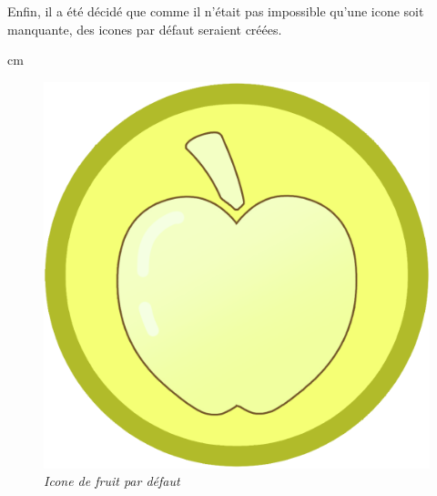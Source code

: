 \documentclass[12pt]{article}
\begin{document}
    Enfin, il a été décidé que comme il n'était pas impossible qu'une icone soit manquante, des icones par défaut seraient créées. 

     cm

    \begin{figure}[h!]
        \centering
        \includegraphics[scale = 0.2]{static/Base_Fruit.png}\\
        \small{\emph{Icone de fruit par défaut}}
        \label{fig:fruit_default}
    \end{figure}    
\end{document}
